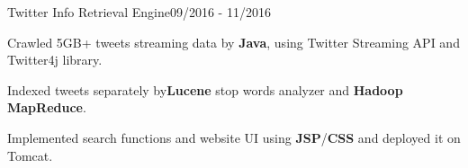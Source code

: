 \begin{rSubsection}{Twitter Info Retrieval Engine}{09/2016 - 11/2016}{}{} 
\item Crawled 5GB+ tweets streaming data by {\bf Java}, using Twitter Streaming API and Twitter4j library. 
\item Indexed tweets separately by{\bf  Lucene} stop words analyzer and {\bf Hadoop} {\bf MapReduce}.
\item Implemented search functions and website UI using {\bf JSP}/{\bf CSS} and deployed it on Tomcat.
\end{rSubsection} 